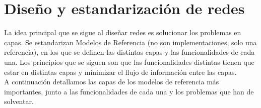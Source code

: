 
\section{Diseño y estandarización de redes}

La idea principal que se sigue al diseñar redes es solucionar los problemas en capas. Se estandarizan Modelos de Referencia (no son implementaciones, solo una referencia), en los que se definen las distintas capas y las funcionalidades de cada una. Los principios que se siguen son que las funcionalidades distintas tienen que estar en distintas capas y minimizar el flujo de información entre las capas.\\

A continuación detallamos las capas de los modelos de referencia más importantes, junto a las funcionalidades de cada una y los problemas que han de solventar.
